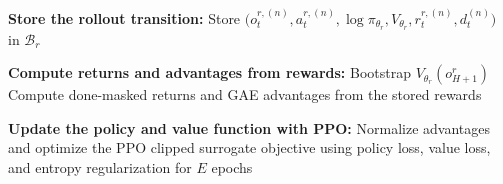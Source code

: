 \begin{algorithm}[H]
\begin{algorithmic}[1]
    \State \textbf{Store the rollout transition:}
    \State \hspace{1em} Store $\big(o_t^{r,(n)}, a_t^{r,(n)}, \log \pi_{\theta_r}, V_{\theta_r}, r_t^{r,(n)}, d_t^{(n)}\big)$ in $\mathcal{B}_r$
  \EndFor

  \State \textbf{Compute returns and advantages from rewards:}
  \State \hspace{1em} Bootstrap $V_{\theta_r}(o_{H+1}^r)$
  \State \hspace{1em} Compute done-masked returns and GAE advantages from the stored rewards

  \State \textbf{Update the policy and value function with PPO:}
  \State \hspace{1em} Normalize advantages and optimize the PPO clipped surrogate objective
  \State \hspace{1em} using policy loss, value loss, and entropy regularization for $E$ epochs
\EndFor
\end{algorithmic}
\end{algorithm}
